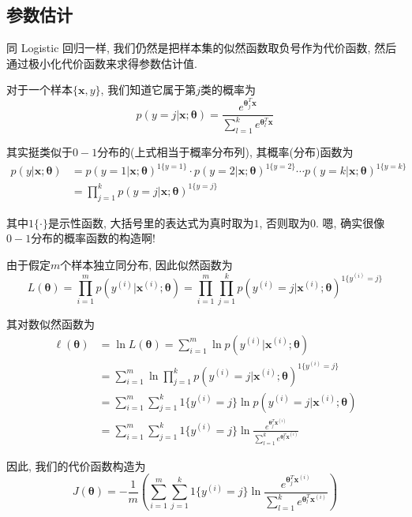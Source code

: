\documentclass[a4paper,UTF8]{ctexart}
\theoremstyle{plain} \newtheorem{theorem}{定理}[section]
\theoremstyle{plain} \newtheorem{definition}{定义}[section]
\theoremstyle{plain} \newtheorem{lemma}{引理}[section]
\theoremstyle{plain} \newtheorem{proposition}{命题}[section]
\theoremstyle{plain} \newtheorem{example}{例}[section]
\theoremstyle{plain} \newtheorem{remark}{注}[section]
\theoremstyle{plain} \newtheorem{corollary}{推论}[section]
\begin{document}
\subsection{参数估计}
同 Logistic 回归一样, 我们仍然是把样本集的似然函数取负号作为代价函数, 然后通过极小化代价函数来求得参数估计值.

对于一个样本$\{\bm{x}, y\}$, 我们知道它属于第$j$类的概率为
\begin{equation*}
p(y = j | \bm{x}; \bm{\theta}) = \frac{e^{\bm{\theta}_{j}^T \bm{x}}}{\sum_{l=1}^{k} e^{\bm{\theta}_{l}^T \bm{x}}}
\end{equation*}

其实挺类似于$0-1$分布的(上式相当于概率分布列), 其概率(分布)函数为
\begin{align*}
p(y | \bm{x}; \bm{\theta}) & = p(y = 1 | \bm{x}; \bm{\theta})^{1\{y=1\}} \cdot p(y = 2 | \bm{x}; \bm{\theta})^{1\{y=2\}} \cdots p(y = k | \bm{x}; \bm{\theta})^{1\{y=k\}} \\ 
& = \prod_{j=1}^{k} p(y = j | \bm{x}; \bm{\theta})^{1\{y=j\}}
\end{align*}

其中$1\{\cdot\}$是示性函数, 大括号里的表达式为真时取为$1$, 否则取为$0$. 嗯, 确实很像$0-1$分布的概率函数的构造啊!

由于假定$m$个样本独立同分布, 因此似然函数为
\begin{equation*}
L(\bm{\theta}) = \prod_{i=1}^{m} p(y^{(i)} | \bm{x}^{(i)}; \bm{\theta}) = \prod_{i=1}^{m} \prod_{j=1}^{k} p(y^{(i)} = j | \bm{x}^{(i)}; \bm{\theta})^{1\{y^{(i)}=j\}}
\end{equation*}

其对数似然函数为
\begin{align*}
\ell (\bm{\theta}) & = \ln L(\bm{\theta}) = \sum_{i=1}^{m} \ln p(y^{(i)} | \bm{x}^{(i)}; \bm{\theta}) \\ 
& = \sum_{i=1}^{m} \ln \prod_{j=1}^{k} p(y^{(i)} = j | \bm{x}^{(i)}; \bm{\theta})^{1\{y^{(i)}=j\}} \\ 
& = \sum_{i=1}^{m} \sum_{j=1}^{k} 1\{y^{(i)}=j\} \ln p(y^{(i)} = j | \bm{x}^{(i)}; \bm{\theta}) \\ 
& = \sum_{i=1}^{m} \sum_{j=1}^{k} 1\{y^{(i)}=j\} \ln \frac{e^{\bm{\theta}_{j}^T \bm{x}^{(i)}}}{\sum_{l=1}^{k} e^{\bm{\theta}_{l}^T \bm{x}^{(i)}}}
\end{align*}

因此, 我们的代价函数构造为
\begin{equation*}
J(\bm{\theta}) = - \frac{1}{m} \left( \sum_{i=1}^{m} \sum_{j=1}^{k} 1\{y^{(i)}=j\} \ln \frac{e^{\bm{\theta}_{j}^T \bm{x}^{(i)}}}{\sum_{l=1}^{k} e^{\bm{\theta}_{l}^T \bm{x}^{(i)}}} \right)
\end{equation*}
\end{document}
